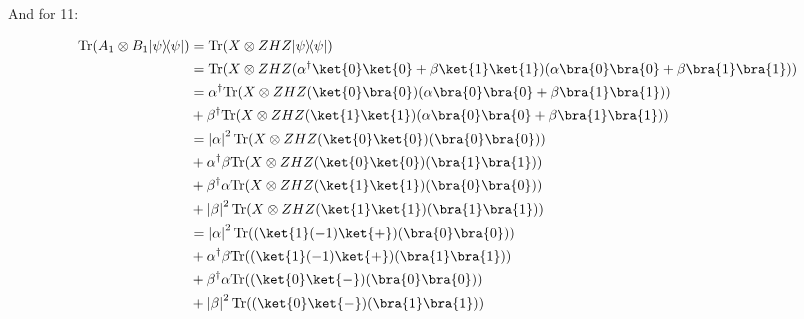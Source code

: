 \documentclass{article}
\newcommand{\ketbra}[2]{|#1\rangle\!\langle #2|}
\newcommand{\trace}{{\rm Tr}}
\newcommand{\abs}[1]{\left\lvert #1 \right\rvert}
\begin{document}
\begin{enumerate}
\begin{enumerate}
                And for 11:

                $$\begin{aligned}
                    \trace(A_1\otimes B_1\ketbra{\psi}{\psi}) & = \trace(X\otimes ZHZ\ketbra{\psi}{\psi})                                                                          \\
                                                              & = \trace(X\otimes ZHZ(\alpha^\dagger\ket{0}\ket{0}+\beta\ket{1}\ket{1})(\alpha\bra{0}\bra{0}+\beta\bra{1}\bra{1})) \\
                                                              & = \alpha^\dagger\trace(X\otimes ZHZ(\ket{0}\bra{0})(\alpha\bra{0}\bra{0}+\beta\bra{1}\bra{1}))                     \\
                                                              & + \beta^\dagger\trace(X\otimes ZHZ(\ket{1}\ket{1})(\alpha\bra{0}\bra{0}+\beta\bra{1}\bra{1}))                      \\
                                                              & = \abs{\alpha}^2\trace(X\otimes ZHZ(\ket{0}\ket{0})(\bra{0}\bra{0}))                                               \\
                                                              & + \alpha^\dagger\beta\trace(X\otimes ZHZ(\ket{0}\ket{0})(\bra{1}\bra{1}))                                          \\
                                                              & + \beta^\dagger\alpha\trace(X\otimes ZHZ(\ket{1}\ket{1})(\bra{0}\bra{0}))                                          \\
                                                              & + \abs{\beta}^2\trace(X\otimes ZHZ(\ket{1}\ket{1})(\bra{1}\bra{1}))                                                \\
                                                              & = \abs{\alpha}^2\trace((\ket{1}(-1)\ket{+})(\bra{0}\bra{0}))                                                       \\
                                                              & + \alpha^\dagger\beta\trace((\ket{1}(-1)\ket{+})(\bra{1}\bra{1}))                                                  \\
                                                              & + \beta^\dagger\alpha\trace((\ket{0}\ket{-})(\bra{0}\bra{0}))                                                      \\
                                                              & + \abs{\beta}^2\trace((\ket{0}\ket{-})(\bra{1}\bra{1}))                                                            \\

\end{aligned}$$
\end{enumerate}
\end{enumerate}
\end{document}
